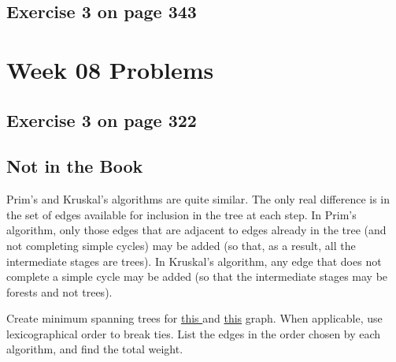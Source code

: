 \documentclass[12pt]{amsart}
\begin{document}
\subsection{Exercise 3 on page 343}


\section{Week 08 Problems}
\subsection{Exercise 3 on page 322}
\subsection{Not in the Book}

  Prim\textquoteright{}s and Kruskal\textquoteright{}s algorithms are quite similar. The only real difference is in the set of edges available for inclusion in the tree at each step. In Prim\textquoteright{}s algorithm, only those edges that are adjacent to edges already in the tree (and not completing simple cycles) may be added (so that, as a result, all the intermediate stages are trees). In Kruskal\textquoteright{}s algorithm, any edge that does not complete a simple cycle may be added (so that the intermediate stages may be forests and not trees). 
  
  Create minimum spanning trees for 
  \href{https://firstthreeodds.org/mstgraphs/mstgraph1.png}{ this } and \href{https://firstthreeodds.org/mstgraphs/mstgraph2.png}{this} graph. When applicable, use lexicographical order to break ties. List the edges in the order chosen by each algorithm, and find the total weight.


  
\end{document}
